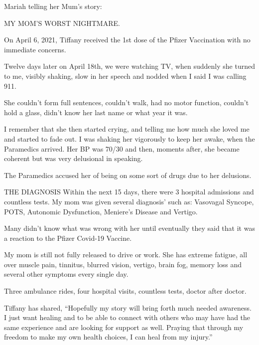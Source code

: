 

Mariah telling her Mum’s story:

MY MOM’S WORST NIGHTMARE.

On April 6, 2021, Tiffany received the 1st dose of the Pfizer Vaccination with
no immediate concerns.

Twelve days later on April 18th, we were watching TV, when suddenly she turned
to me, visibly shaking, slow in her speech and nodded when I said I was calling
911.

She couldn’t form full sentences, couldn’t walk, had no motor function, couldn’t
hold a glass, didn’t know her last name or what year it was.

I remember that she then started crying, and telling me how much she loved me
and started to fade out. I was shaking her vigorously to keep her awake, when
the Paramedics arrived. Her BP was 70/30 and then, moments after, she became
coherent but was very delusional in speaking.

The Paramedics accused her of being on some sort of drugs due to her delusions.

THE DIAGNOSIS Within the next 15 days, there were 3 hospital admissions and
countless tests. My mom was given several diagnosis’ such as: Vasovagal Syncope,
POTS, Autonomic Dysfunction, Meniere’s Disease and Vertigo.

Many didn’t know what was wrong with her until eventually they said that it was a reaction to the Pfizer Covid-19 Vaccine.

My mom is still not fully released to drive or work. She has extreme fatigue,
all over muscle pain, tinnitus, blurred vision, vertigo, brain fog, memory loss
and several other symptoms every single day.

Three ambulance rides, four hospital visits, countless tests, doctor after
doctor.

Tiffany has shared, “Hopefully my story will bring forth much needed
awareness. I just want healing and to be able to connect with others who may
have had the same experience and are looking for support as well. Praying that
through my freedom to make my own health choices, I can heal from my injury.”
